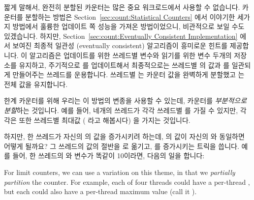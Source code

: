 짧게 말해서, 완전히 분할된 카운터는 많은 중요 워크로드에서 사용할 수 없습니다.
카운터를 분할하는 방법은 Section~\ref{sec:count:Statistical Counters} 에서
이야기한 세가지 방법에서 훌륭한 업데이트 쪽 성능을 가져온 방법이었으니,
비관적으로 보일 수도 있겠습니다.
하지만, Section~\ref{sec:count:Eventually Consistent Implementation} 에서
보여진 최종적 일관성 (eventually consistent) 알고리즘이 흥미로운 힌트를
제공합니다.
이 알고리즘은 업데이트를 위한 쓰레드별  변수와 읽기를 위한
 변수 두개의 저장소를 유지하고, 주기적으로 
를 업데이트해서 최종적으로는 쓰레드별  의 값과  를
일관되게 만들어주는  쓰레드를 운용합니다.
쓰레드별  는 카운터 값을 완벽하게 분할했고  는
전체 값을 유지합니다.

한계 카운터를 위해 우리는 이 방법의 변종을 사용할 수 있는데, 카운터를
\emph{부분적으로 분할}하는 것입니다.
예를 들어, 네개의 쓰레드가 각각 쓰레드별  를 가질 수 있지만, 각각은
또한 쓰레드별 최대값 ( 라고 해봅시다) 을 가지는 것입니다.

하지만, 한 쓰레드가 자신의  의 값을 증가시키려 하는데, 
의 값이 자신의  와 동일하면 어떻게 될까요?
그 쓰레드의  값의 절반을  로 옮기고, 
를 증가시키는 트릭을 씁니다.
예를 들어, 한 쓰레드의  와  변수가 똑같이 10이라면,
다음의 일을 합니다:
\iffalse

For limit counters, we can use a variation on this theme, in that
we \emph{partially partition} the counter.
For example, each of four threads could have a per-thread
, but each could also have a per-thread maximum value
(call it ).

